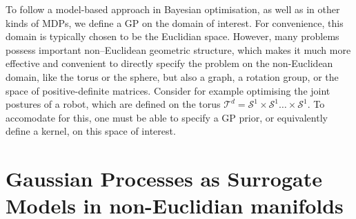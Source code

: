 To follow a model-based approach in Bayesian optimisation, as well as in other kinds of MDPs, we define a GP on the domain of interest. For convenience, this domain is typically chosen to be the Euclidian space. However, many problems possess important non–Euclidean geometric structure, which makes it much more effective and convenient to directly specify the problem on the non-Euclidean domain, like the torus or the sphere, but also a graph, a rotation group, or the space of positive-definite matrices. Consider for example optimising the joint postures of a robot, which are defined on the torus $\mathcal{T}^d = \mathcal{S}^1 \times \mathcal{S}^1 \ldots \times \mathcal{S}^1$. To accomodate for this, one must be able to specify a GP prior, or equivalently define a kernel, on this space of interest.

\section{Gaussian Processes as Surrogate Models in non-Euclidian manifolds}
\label{sec:gop-noneuclidian}


